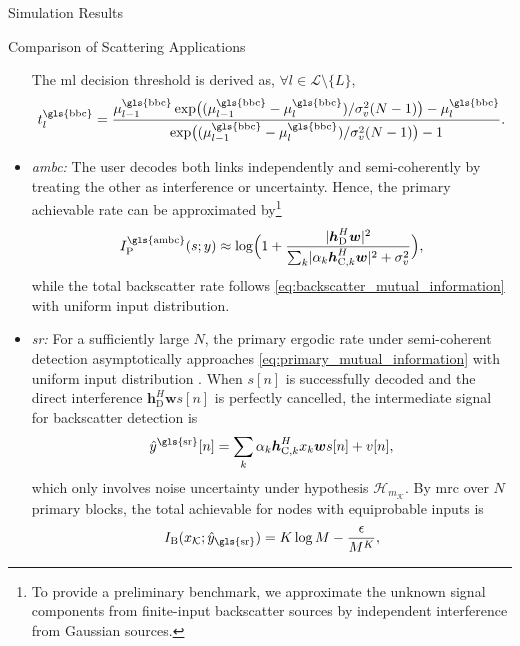 \documentclass[journal]{IEEEtran}
\begin{document}
\begin{section}{Simulation Results}
\begin{subsection}{Comparison of Scattering Applications}
\begin{itemize}
			The \gls{ml} decision threshold is derived as, $\forall l \in \mathcal{L} \setminus \{L\}$,
			\begin{equation}
				t_l^{\text{\gls{bbc}}} = \frac{\mu_{l-1}^{\text{\gls{bbc}}} \exp \bigl((\mu_{l-1}^{\text{\gls{bbc}}}-\mu_{l}^{\text{\gls{bbc}}})/\sigma_v^2 (N-1)\bigr) - \mu_{l}^{\text{\gls{bbc}}}}{\exp \bigl((\mu_{l-1}^{\text{\gls{bbc}}}-\mu_{l}^{\text{\gls{bbc}}})/\sigma_v^2 (N-1)\bigr) - 1}.
				\label{eq:detection_threshold_ml_bbc}
			\end{equation}
			\item \emph{\gls{ambc}:} The user decodes both links independently and semi-coherently by treating the other as interference or uncertainty.
			Hence, the primary achievable rate can be approximated by\footnote{To provide a preliminary benchmark, we approximate the unknown signal components from finite-input backscatter sources by independent interference from Gaussian sources.}
			\begin{equation}
				I_{\mathrm{P}}^{\text{\gls{ambc}}}(s;y) \approx \log \Bigl(1 + \frac{\lvert\boldsymbol{h}_{\mathrm{D}}^H\boldsymbol{w}\rvert^2}{\sum_{k}\lvert \alpha_k \boldsymbol{h}_{\mathrm{C},k}^H \boldsymbol{w}\rvert^2+\sigma_v^2}\Bigr),
			\end{equation}
			while the total backscatter rate follows \eqref{eq:backscatter_mutual_information} with uniform input distribution.
			\item \emph{\gls{sr}:} For a sufficiently large $N$, the primary ergodic rate under semi-coherent detection asymptotically approaches \eqref{eq:primary_mutual_information} with uniform input distribution \cite{Long2020a}.
			When $s[n]$ is successfully decoded and the direct interference $\boldsymbol{h}_{\mathrm{D}}^H \boldsymbol{w} s[n]$ is perfectly cancelled, the intermediate signal for backscatter detection is
			\begin{equation}
				\hat{y}^{\text{\gls{sr}}}[n] = \sum_{k} \alpha_k \boldsymbol{h}_{\mathrm{C},k}^H x_k \boldsymbol{w} s[n] + v[n],
			\end{equation}
			which only involves noise uncertainty under hypothesis $\mathcal{H}_{m_{\mathcal{K}}}$.
			By \gls{mrc} over $N$ primary blocks, the total achievable for nodes with equiprobable inputs is \cite{Wang2014a}
			\begin{equation}
				I_{\mathrm{B}}(x_{\mathcal{K}};\hat{y}_{\text{\gls{sr}}}) = K \log M - \frac{\epsilon}{M^K},

\end{equation}
\end{itemize}
\end{subsection}
\end{section}
\end{document}
